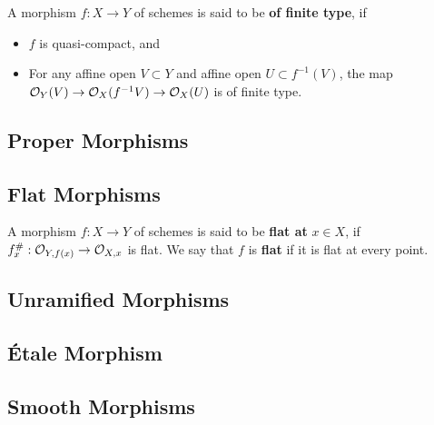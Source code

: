 A morphism $f: X\to Y$ of schemes is said to be
\textbf{of finite type}, if
\begin{itemize}
    \item $f$ is quasi-compact, and
    \item For any affine open $V\subset Y$ and affine open $U\subset f^{-1}(V)$, the map $\mathcal{O}_Y(V)\to\mathcal{O}_X(f^{-1}V)\to\mathcal{O}_X(U)$ is of finite type.
\end{itemize}

\subsection{Proper Morphisms}

\subsection{Flat Morphisms}
A morphism $f : X\to Y$ of schemes is said to be
\textbf{flat at} $x\in X$, if $f^\#_x : \mathcal{O}_{Y, f(x)}\to \mathcal{O}_{X, x}$ is flat.
We say that $f$ is \textbf{flat} if it is flat at every point.

\subsection{Unramified Morphisms}

\subsection{\'Etale Morphism}

\subsection{Smooth Morphisms}

